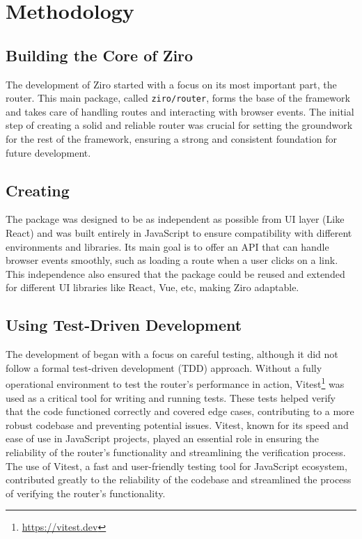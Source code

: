 \section{Methodology} %

\subsection{Building the Core of Ziro}
The development of Ziro started with a focus on its most important part, the router. This main package, called \texttt{ziro/router}, forms the base of the framework and takes care of handling routes and interacting with browser events. The initial step of creating a solid and reliable router was crucial for setting the groundwork for the rest of the framework, ensuring a strong and consistent foundation for future development.

\subsection{Creating }
The  package was designed to be as independent as possible from UI layer (Like React) and was built entirely in JavaScript to ensure compatibility with different environments and libraries. Its main goal is to offer an API that can handle browser events smoothly, such as loading a route when a user clicks on a link. This independence also ensured that the package could be reused and extended for different UI libraries like React, Vue, etc, making Ziro adaptable.

\subsection{Using Test-Driven Development}
The development of  began with a focus on careful testing, although it did not follow a formal test-driven development (TDD) approach. Without a fully operational environment to test the router's performance in action, Vitest\footnote{\url{https://vitest.dev}} was used as a critical tool for writing and running tests. These tests helped verify that the code functioned correctly and covered edge cases, contributing to a more robust codebase and preventing potential issues. Vitest, known for its speed and ease of use in JavaScript projects, played an essential role in ensuring the reliability of the router's functionality and streamlining the verification process. The use of Vitest, a fast and user-friendly testing tool for JavaScript ecosystem, contributed greatly to the reliability of the codebase and streamlined the process of verifying the router's functionality.

